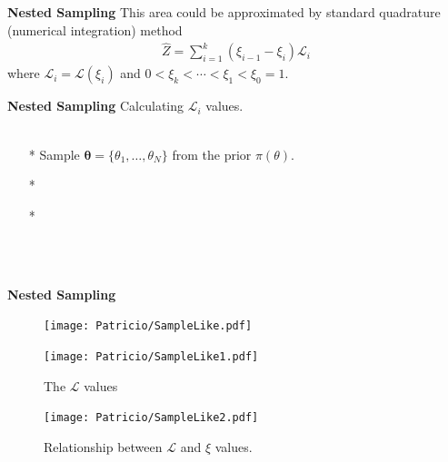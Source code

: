 \begin{frame}{\small{\textbf{Nested Sampling}}}
This area could be approximated by standard quadrature (numerical integration) method 
\begin{align*}
\widehat{Z} = \sum_{i=1}^{k}(\xi_{i-1}-\xi_{i}) \mathcal L_{i}
\end{align*}
where $\mathcal L_{i}= \mathcal L (\xi_{i})$ and $0<\xi_k<\cdots<\xi_{1}<\xi_{0}=1$.
\end{frame}
\begin{frame}{\small{\textbf{Nested Sampling}}}
Calculating $\mathcal L_{i}$ values. \\~\\

\begin{itemize}
	\item [*] Sample $\bm\theta=\{\theta_{1}, \ldots , \theta_{N}\}$ from the prior $\pi(\theta)$.
	\item [*] 
	\item [*] 
\end{itemize}

\\~\\

\end{frame}
\begin{frame}{\small{\textbf{Nested Sampling}}}
\begin{overprint}
\begin{figure}[]    		
		\texttt{[image: Patricio/SampleLike.pdf]}
\end{figure}
\begin{figure}[]    		
		\texttt{[image: Patricio/SampleLike1.pdf]}
		\caption{The $\mathcal L$ values }
\end{figure}
\begin{figure}[]    		
		\texttt{[image: Patricio/SampleLike2.pdf]}
		\caption{Relationship between $\mathcal L$ and $\xi$ values.}
\end{figure}
\end{overprint}
\end{frame}
